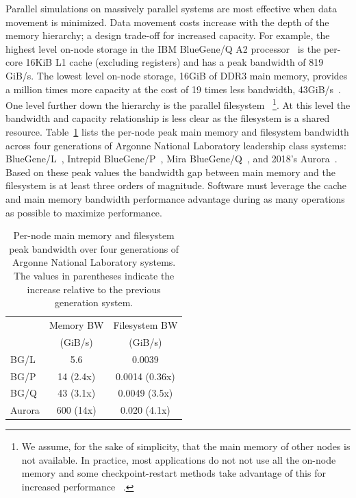 \documentclass[a4paper]{article}
\begin{document}
Parallel simulations on massively parallel systems are most effective when data
movement is minimized.
Data movement costs increase with the depth of the memory hierarchy; a design
trade-off for increased capacity.
For example, the highest level on-node storage in the IBM BlueGene/Q A2
processor~\cite{haring2012ibm} is the per-core 16KiB L1 cache (excluding
registers) and has a peak bandwidth of 819 GiB/s.
The lowest level on-node storage, 16GiB of DDR3 main memory, provides a million
times more capacity at the cost of 19 times less bandwidth,
43GiB/s~\cite{lo2014roofline}.
One level further down the hierarchy is the parallel filesystem
~\footnote{We assume, for the sake of simplicity, that the main memory of other nodes is not
available.
In practice, most applications do not not use all the on-node memory and some
checkpoint-restart methods take advantage of this for increased performance
~\cite{rma-fault-tolerance-2014,isaila2014making,compression-cr-2012}.
}.
At this level the bandwidth and capacity relationship is less clear as the
filesystem is a shared resource.
Table~\ref{tbl:systems} lists the per-node peak main memory and filesystem
bandwidth across four generations of Argonne National Laboratory leadership
class systems: BlueGene/L~\cite{yu2006high,adiga2002overview}, Intrepid
BlueGene/P~\cite{lang2009performance,alam2008early}, Mira
BlueGene/Q~\cite{haring2012ibm,bui2014scalable}, and 2018's
Aurora~\cite{aurorafacts}.
Based on these peak values the bandwidth gap between main memory and the
filesystem is at least three orders of magnitude.
Software must leverage the cache and main memory bandwidth performance advantage
during as many operations as possible to maximize performance.

\begin{table}[h]
\centering
\caption{Per-node main memory and filesystem peak bandwidth over four
  generations of Argonne National Laboratory systems.
  The values in parentheses indicate the increase relative to
  the previous generation system.}
\label{tbl:systems}
\begin{tabular}{l|cc}
        & Memory BW & Filesystem BW \\
        & (GiB/s)    & (GiB/s)    \\
 \hline
 BG/L   & 5.6       & 0.0039         \\
 BG/P   & 14 (2.4x) & 0.0014 (0.36x)   \\
 BG/Q   & 43 (3.1x) & 0.0049 (3.5x) \\
 Aurora & 600 (14x) & 0.020 (4.1x)
\end{tabular}
\end{table}
\end{document}
